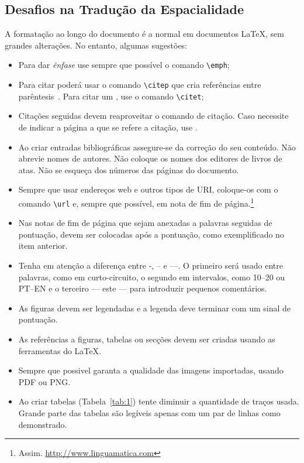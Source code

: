\documentclass[a4paper, twocolumn, 11pt, twoside]{article}
\begin{document}
\subsection{Desafios na Tradução da Espacialidade}

A formatação ao longo do documento é a normal em documentos \LaTeX, sem grandes alterações. No entanto,
algumas sugestões:
\begin{itemize}
\item Para dar \emph{ênfase} use sempre que possível o comando \verb.\emph.;
\item Para citar poderá usar o comando \verb.\citep. que cria referências entre
  parêntesis~\citep{latex}. Para citar um \citet{autor}, use o comando \verb.\citet.;
\item Citações seguidas devem reaproveitar o comando de citação. Caso necessite de indicar a página
  a que se refere a citação, use \citep[p.~40]{latex}.
\item Ao criar entradas bibliográficas assegure-se da correção do seu
  conteúdo. Não abrevie nomes de autores. Não coloque os nomes dos
  editores de livros de atas. Não se esqueça dos números das páginas
  do documento.
\item Sempre que usar endereços web e outros tipos de URI, coloque-os com o comando \verb.\url. e,
  sempre que possível, em nota de fim de página.\footnote{Assim. \url{http://www.linguamatica.com}}
\item Nas notas de fim de página que sejam anexadas a palavras seguidas de pontuação, devem ser colocadas
  após a pontuação, como exemplificado no item anterior.
\item Tenha em atenção a diferença entre -, -- e ---. O primeiro será usado entre palavras, como em
  curto-circuito, o segundo em intervalos, como 10--20 ou PT--EN e o terceiro --- este --- para
  introduzir pequenos comentários.
\item As figuras devem ser legendadas e a legenda deve terminar com um sinal de pontuação.
\item As referências a figuras, tabelas ou secções devem ser criadas usando as ferramentas do \LaTeX{}.
\item Sempre que possivel garanta a qualidade das imagens importadas, usando PDF ou PNG.
\item Ao criar tabelas (Tabela~\ref{tab:1}) tente diminuir a quantidade de traços usada. Grande parte das
  tabelas são legíveis apenas com um par de linhas como demonstrado.
\end{itemize}
\end{document}
